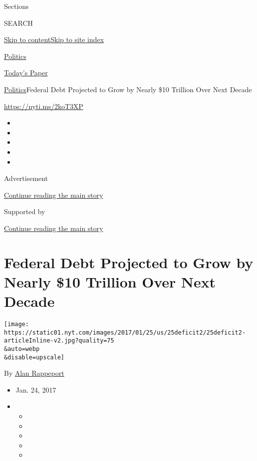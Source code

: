 Sections

SEARCH

\protect\hyperlink{site-content}{Skip to
content}\protect\hyperlink{site-index}{Skip to site index}

\href{https://www.nytimes.com/section/politics}{Politics}

\href{https://myaccount.nytimes.com/auth/login?response_type=cookie\&client_id=vi}{}

\href{https://www.nytimes.com/section/todayspaper}{Today's Paper}

\href{/section/politics}{Politics}\textbar{}Federal Debt Projected to
Grow by Nearly \$10 Trillion Over Next Decade

\url{https://nyti.ms/2koT3XP}

\begin{itemize}
\item
\item
\item
\item
\item
\end{itemize}

Advertisement

\protect\hyperlink{after-top}{Continue reading the main story}

Supported by

\protect\hyperlink{after-sponsor}{Continue reading the main story}

\hypertarget{federal-debt-projected-to-grow-by-nearly-10-trillion-over-next-decade}{%
\section{Federal Debt Projected to Grow by Nearly \$10 Trillion Over
Next
Decade}\label{federal-debt-projected-to-grow-by-nearly-10-trillion-over-next-decade}}

\texttt{[image: https://static01.nyt.com/images/2017/01/25/us/25deficit2/25deficit2-articleInline-v2.jpg?quality=75\\\&auto=webp\\\&disable=upscale]}

By \href{https://www.nytimes.com/by/alan-rappeport}{Alan Rappeport}

\begin{itemize}
\item
  Jan. 24, 2017
\item
  \begin{itemize}
  \item
  \item
  \item
  \item
  \item
  \end{itemize}
\end{itemize}

